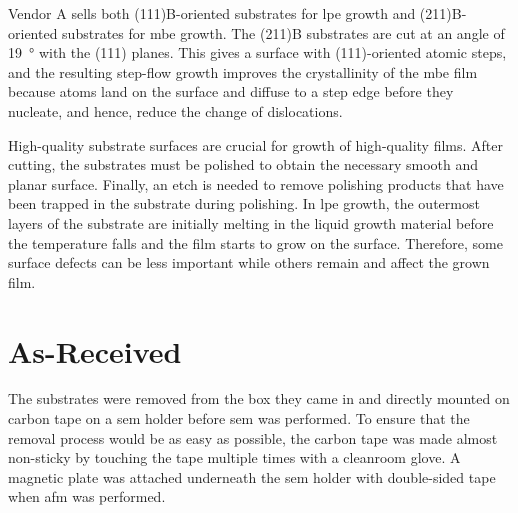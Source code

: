 Vendor A sells both (111)B-oriented substrates for \ac{lpe} growth and (211)B-oriented substrates for \ac{mbe} growth. The (211)B substrates are cut at an angle of \SI{19}{\degree} with the (111) planes. This gives a surface with (111)-oriented atomic steps, and the resulting step-flow growth improves the crystallinity of the \ac{mbe} film because atoms land on the surface and diffuse to a step edge before they nucleate, and hence, reduce the change of dislocations. 

High-quality substrate surfaces are crucial for growth of high-quality films. After cutting, the substrates must be polished to obtain the necessary smooth and planar surface. Finally, an etch is needed to remove polishing products that have been trapped in the substrate during polishing. In \ac{lpe} growth, the outermost layers of the substrate are initially melting in the liquid growth material before the temperature falls and the film starts to grow on the surface. Therefore, some surface defects can be less important while others remain and affect the grown film.

%

\section{As-Received}
The substrates were removed from the box they came in and directly mounted on carbon tape on a \ac{sem} holder before \ac{sem} was performed. To ensure that the removal process would be as easy as possible, the carbon tape was made almost non-sticky by touching the tape multiple times with a cleanroom glove. A magnetic plate was attached underneath the \ac{sem} holder with double-sided tape when \ac{afm} was performed. 

